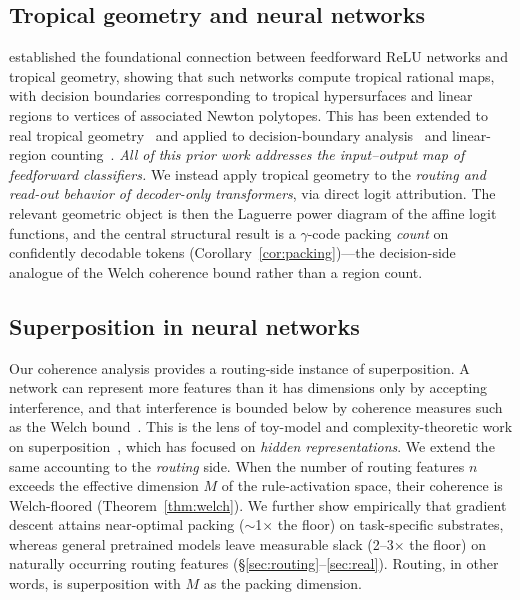 \documentclass[sigconf,nonacm]{acmart}
\theoremstyle{definition}
\begin{document}
\subsection{Tropical geometry and neural networks}
\citet{zhang2018tropical} established the foundational connection between feedforward
ReLU networks and tropical geometry, showing that such networks compute tropical
rational maps, with decision boundaries corresponding to tropical hypersurfaces and
linear regions to vertices of associated Newton polytopes. This has been extended to
real tropical geometry~\cite{brandenburg2024real} and applied to decision-boundary
analysis~\cite{alfarra2023decision} and linear-region
counting~\cite{montufar2014regions,serra2018regions}. \emph{All of this prior work
addresses the input--output map of feedforward classifiers.} We instead apply
tropical geometry to the \emph{routing and read-out behavior of decoder-only
transformers}, via direct logit attribution. The relevant geometric object is then
the Laguerre power diagram of the affine logit functions, and the central structural
result is a $\gamma$-code packing \emph{count} on confidently decodable tokens
(Corollary~\ref{cor:packing})---the decision-side analogue of the Welch coherence
bound rather than a region count.

\subsection{Superposition in neural networks}
Our coherence analysis provides a routing-side instance of superposition. A network
can represent more features than it has dimensions only by accepting interference, and
that interference is bounded below by coherence measures such as the Welch
bound~\cite{welch1974lower}. This is the lens of toy-model and complexity-theoretic
work on superposition~\cite{elhage2022superposition,adler2024superposition}, which
has focused on \emph{hidden representations}. We extend the same accounting to the
\emph{routing} side. When the number of routing features $n$ exceeds the effective
dimension $M$ of the rule-activation space, their coherence is Welch-floored
(Theorem~\ref{thm:welch}). We further show empirically that gradient descent attains
near-optimal packing ($\sim$1$\times$ the floor) on task-specific substrates, whereas
general pretrained models leave measurable slack (2--3$\times$ the floor) on
naturally occurring routing features (\S\ref{sec:routing}--\ref{sec:real}). Routing,
in other words, is superposition with $M$ as the packing dimension.
\end{document}
